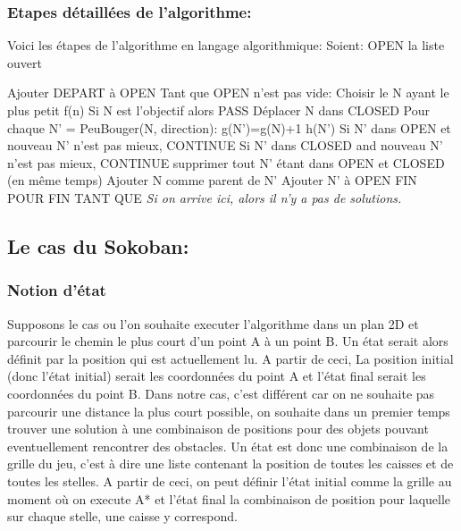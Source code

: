 \documentclass{article}
\begin{document}
\subsubsection{Etapes détaillées de l'algorithme:}
Voici les étapes de l'algorithme en langage algorithmique: \newline
Soient: OPEN la liste ouvert \newline

Ajouter DEPART à OPEN \newline
Tant que OPEN n'est pas vide:\newline
	Choisir le N ayant le plus petit f(n)\newline
	Si N est l'objectif alors PASS\newline
	Déplacer N dans CLOSED\newline
	Pour chaque N' = PeuBouger(N, direction):\newline
		g(N')=g(N)+1\newline
		h(N')\newline
		Si N' dans OPEN et nouveau N' n'est pas mieux, CONTINUE\newline
		Si N' dans CLOSED and nouveau N' n'est pas mieux, CONTINUE\newline
		supprimer tout N' étant dans OPEN et CLOSED (en même temps)\newline
		Ajouter N comme parent de N'\newline
		Ajouter N' à OPEN\newline
	FIN POUR\newline
FIN TANT QUE\newline
\textit{Si on arrive ici, alors il n'y a pas de solutions.}
			
\subsection{Le cas du Sokoban:}
\subsubsection{Notion d'état}
Supposons le cas ou l'on souhaite executer l'algorithme dans un plan 2D et parcourir le chemin le plus court d'un point A à un point B. Un état serait alors 
définit par la position qui est actuellement lu. A partir de ceci, La position initial (donc l'état initial) serait les coordonnées du point A et l'état final serait les coordonnées du point B.
\newline
Dans notre cas, c'est différent car on ne souhaite pas parcourir une distance la plus court possible, on souhaite dans un premier temps trouver une solution à une combinaison de positions pour des
objets pouvant eventuellement rencontrer des obstacles. Un état est donc une combinaison de la grille du jeu, c'est à dire une liste contenant la position de toutes les caisses et de toutes les stelles.
A partir de ceci, on peut définir l'état initial comme la grille au moment où on execute A* et l'état final la combinaison de position pour laquelle sur chaque stelle, une caisse y correspond.
\end{document}
